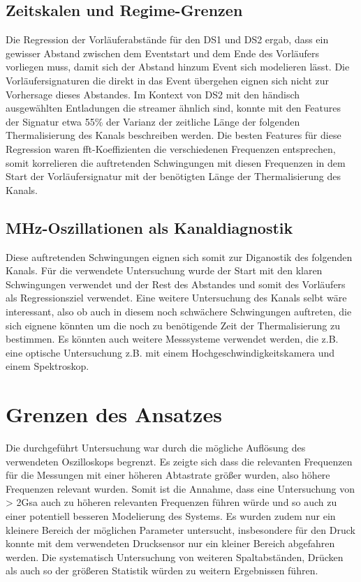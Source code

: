 \subsection{Zeitskalen und Regime-Grenzen}
Die Regression der Vorläuferabstände für den DS1 und DS2 ergab, dass ein gewisser Abstand zwischen dem Eventstart und dem Ende des Vorläufers vorliegen muss, damit sich der Abstand hinzum Event sich modelieren lässt. Die Vorläufersignaturen die direkt in das Event übergehen eignen sich nicht zur Vorhersage dieses Abstandes. Im Kontext von DS2 mit den händisch ausgewählten Entladungen die streamer ähnlich sind, konnte mit den Features der Signatur etwa 55\% der Varianz der zeitliche Länge der folgenden Thermalisierung des Kanals beschreiben werden. Die besten Features für diese Regression waren fft-Koeffizienten die verschiedenen Frequenzen entsprechen, somit korrelieren die auftretenden Schwingungen mit diesen Frequenzen in dem Start der Vorläufersignatur mit der benötigten Länge der Thermalisierung des Kanals.

\subsection{MHz-Oszillationen als Kanaldiagnostik}
Diese auftretenden Schwingungen eignen sich somit zur Diganostik des folgenden Kanals. Für die verwendete Untersuchung wurde der Start mit den klaren Schwingungen verwendet und der Rest des Abstandes und somit des Vorläufers als Regressionsziel verwendet. Eine weitere Untersuchung des Kanals selbt wäre interessant, also ob auch in diesem noch schwächere Schwingungen auftreten, die sich eignene könnten um die noch zu benötigende Zeit der Thermalisierung zu bestimmen. Es könnten auch weitere Messsysteme verwendet werden, die z.B. eine optische Untersuchung z.B. mit einem Hochgeschwindigkeitskamera und einem Spektroskop. 

\section{Grenzen des Ansatzes}
Die durchgeführt Untersuchung war durch die mögliche Auflösung des verwendeten Oszilloskops begrenzt. Es zeigte sich dass die relevanten Frequenzen für die Messungen mit einer höheren Abtastrate größer wurden, also höhere Frequenzen relevant wurden. Somit ist die Annahme, dass eine Untersuchung von > 2Gsa auch zu höheren relevanten Frequenzen führen würde und so auch zu einer potentiell besseren Modelierung des Systems. 
Es wurden zudem nur ein kleinere Bereich der möglichen Parameter untersucht, insbesondere für den Druck konnte mit dem verwendeten Drucksensor nur ein kleiner Bereich abgefahren werden. Die systematisch Untersuchung von weiteren Spaltabständen, Drücken als auch so der größeren Statistik würden zu weitern Ergebnissen führen. 


